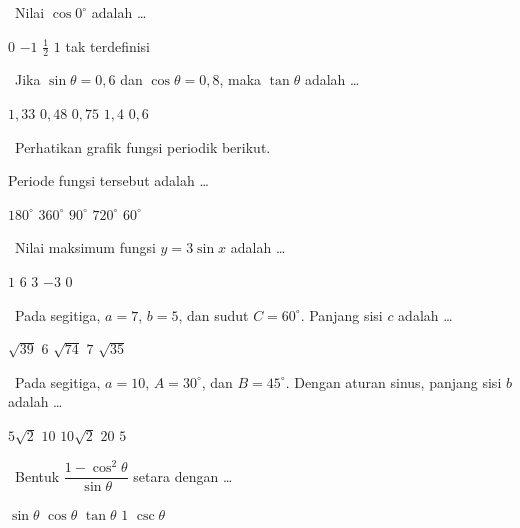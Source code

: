 \documentclass[11pt,a4paper]{exam}
\newcommand{\Fund}{{\footnotesize\textsf{\textcolor{hijau}{[Fundamental]}}}\ }
\newcommand{\Inter}{{\footnotesize\textsf{\textcolor{biru}{[Intermediate]}}}\ }
\newcommand{\Adv}{{\footnotesize\textsf{\textcolor{oranye}{[Advanced]}}}\ }
\begin{document}
\begin{questions}
\question \Fund Nilai $\cos 0^\circ$ adalah \dots
\begin{choices}
\choice $0$ \choice $-1$ \choice $\tfrac{1}{2}$ \CorrectChoice $1$ \choice tak terdefinisi
\end{choices}

\question \Inter Jika $\sin\theta = 0{,}6$ dan $\cos\theta = 0{,}8$, maka $\tan\theta$ adalah \dots
\begin{choices}
\choice $1{,}33$ \choice $0{,}48$ \CorrectChoice $0{,}75$ \choice $1{,}4$ \choice $0{,}6$
\end{choices}

\question \Inter Perhatikan grafik fungsi periodik berikut.

\begin{center}
\end{center}

Periode fungsi tersebut adalah \dots
\begin{choices}
\choice $180^\circ$ \CorrectChoice $360^\circ$ \choice $90^\circ$ \choice $720^\circ$ \choice $60^\circ$
\end{choices}

\question \Inter Nilai maksimum fungsi $y = 3\sin x$ adalah \dots
\begin{choices}
\choice $1$ \choice $6$ \CorrectChoice $3$ \choice $-3$ \choice $0$
\end{choices}

\question \Inter Pada segitiga, $a=7$, $b=5$, dan sudut $C = 60^\circ$. Panjang sisi
$c$ adalah \dots
\begin{choices}
\CorrectChoice $\sqrt{39}$ \choice $6$ \choice $\sqrt{74}$ \choice $7$ \choice $\sqrt{35}$
\end{choices}

\question \Adv Pada segitiga, $a=10$, $A=30^\circ$, dan $B=45^\circ$. Dengan aturan
sinus, panjang sisi $b$ adalah \dots
\begin{choices}
\choice $5\sqrt{2}$ \choice $10$ \CorrectChoice $10\sqrt{2}$ \choice $20$ \choice $5$
\end{choices}

\question \Adv Bentuk $\dfrac{1-\cos^{2}\theta}{\sin\theta}$ setara dengan \dots
\begin{choices}
\CorrectChoice $\sin\theta$ \choice $\cos\theta$ \choice $\tan\theta$ \choice $1$ \choice $\csc\theta$
\end{choices}


\end{questions}
\end{document}

